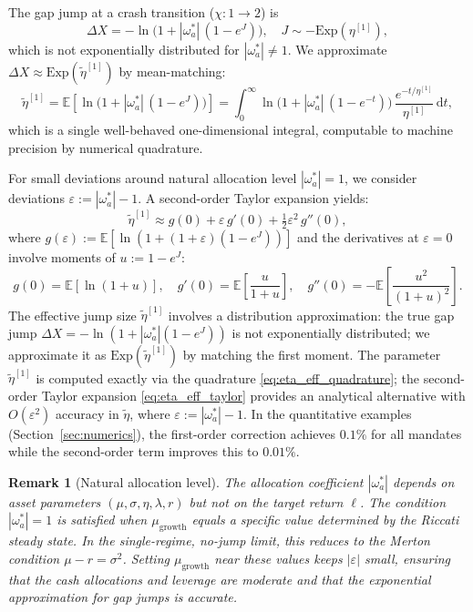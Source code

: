 \documentclass[11pt,a4paper]{article}
\numberwithin{equation}{section}
\newtheorem{remark}[theorem]{Remark}
\newcommand{\E}{\mathbb{E}}
\newcommand{\dd}{\mathrm{d}}
\begin{document}
The gap jump at a crash transition ($\chi: 1\to 2$) is
\begin{equation}\label{eq:gap_jump}
\Delta X = -\ln\!\bigl(1 + |\omega^*_a|\,(1 - e^J)\bigr), \quad J \sim -\mathrm{Exp}(\eta^{[1]}),
\end{equation}
which is not exponentially distributed for $|\omega^*_a| \neq 1$.  We approximate $\Delta X \approx \mathrm{Exp}(\tilde\eta^{[1]})$ by mean-matching:
\begin{equation}\label{eq:eta_eff_quadrature}
\tilde\eta^{[1]} = \E\!\left[\ln\!\bigl(1 + |\omega^*_a|\,(1-e^J)\bigr)\right]
= \int_0^\infty \ln\!\bigl(1 + |\omega^*_a|\,(1-e^{-t})\bigr)\,\frac{e^{-t/\eta^{[1]}}}{\eta^{[1]}}\,\dd t,
\end{equation}
which is a single well-behaved one-dimensional integral, computable to machine precision by numerical quadrature.

For small deviations around natural allocation level $|\omega^*_a|=1$, we consider deviations $\varepsilon := |\omega^*_a| - 1$. A second-order Taylor expansion yields:
\begin{equation}\label{eq:eta_eff_taylor}
\tilde\eta^{[1]} \approx g(0) + \varepsilon\, g'(0) + \tfrac{1}{2}\varepsilon^2\, g''(0),
\end{equation}
where $g(\varepsilon) := \E[\ln(1 + (1+\varepsilon)(1 - e^J))]$ and the derivatives at $\varepsilon = 0$ involve moments of $u := 1 - e^J$:
\[
g(0) = \E[\ln(1+u)], \quad g'(0) = \E\!\left[\frac{u}{1+u}\right], \quad g''(0) = -\E\!\left[\frac{u^2}{(1+u)^2}\right].
\]
The effective jump size $\tilde\eta^{[1]}$ involves a distribution approximation: the true gap jump $\Delta X = -\ln(1 + |\omega^*_a|(1 - e^J))$ is not exponentially distributed; we approximate it as $\mathrm{Exp}(\tilde\eta^{[1]})$ by matching the first moment. The parameter $\tilde\eta^{[1]}$ is computed exactly via the quadrature \eqref{eq:eta_eff_quadrature}; the second-order Taylor expansion \eqref{eq:eta_eff_taylor} provides an analytical alternative with $O(\varepsilon^{2})$ accuracy in $\tilde\eta$, where $\varepsilon := |\omega^*_a| - 1$. In the quantitative examples (Section~\ref{sec:numerics}), the first-order correction achieves $0.1\%$ for all mandates while the second-order term improves this to $0.01\%$. 


\begin{remark}[Natural allocation level]\label{rem:natural_alloc}
The allocation coefficient $|\omega^*_a|$ depends on asset parameters $(\mu, \sigma, \eta, \lambda, r)$ but not on the target return $\ell$.  The condition $|\omega^*_a| = 1$ is satisfied when $\mu_{\mathrm{growth}}$ equals a specific value determined by the Riccati steady state.  In the single-regime, no-jump limit, this reduces to the Merton condition $\mu - r = \sigma^2$. Setting $\mu_{\mathrm{growth}}$ near these values keeps $|\varepsilon|$ small, ensuring that the cash allocations and leverage are moderate and that the exponential approximation for gap jumps is accurate.
\end{remark}
\end{document}
